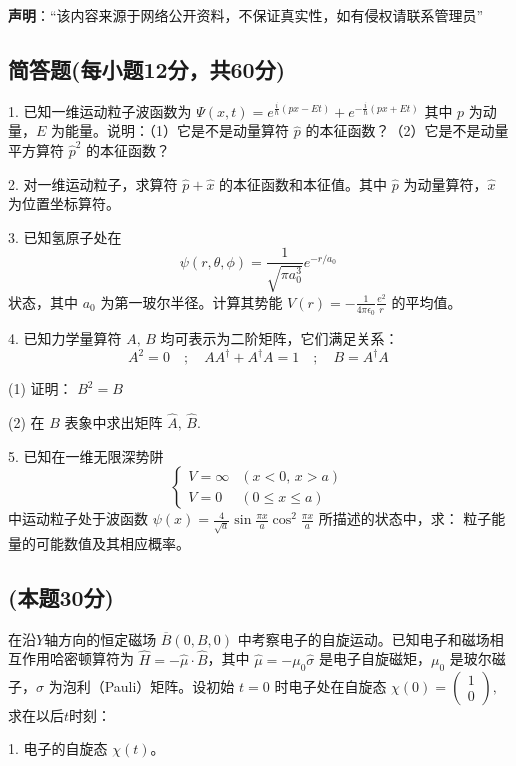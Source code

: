 
\textbf{声明}：“该内容来源于网络公开资料，不保证真实性，如有侵权请联系管理员”

\subsection{简答题(每小题12分，共60分)}
1. 已知一维运动粒子波函数为
$ \Psi(x, t) = e^{\frac{i}{\hbar}(px - Et)} + e^{-\frac{i}{\hbar}(px + Et)}$ 
其中 $p$ 为动量，$E$ 为能量。说明：（1）它是不是动量算符 $\hat{p}$ 的本征函数？（2）它是不是动量平方算符 $\hat{p}^2$ 的本征函数？

2. 对一维运动粒子，求算符 $\hat{p} +\hat{x}$ 的本征函数和本征值。其中 $\hat{p}$ 为动量算符，$\hat{x}$ 为位置坐标算符。

3. 已知氢原子处在
$$ \psi(r, \theta, \phi) = \frac{1}{\sqrt{\pi a_0^3}} e^{-r/a_0}~$$ 
状态，其中 $a_0$ 为第一玻尔半径。计算其势能 $V(r) = -\frac{1}{4\pi \epsilon_0} \frac{e^2}{r}$ 的平均值。

4. 已知力学量算符 $A, \, B$ 均可表示为二阶矩阵，它们满足关系：
$$A^2 = 0 \quad ; \quad AA^{\dagger} + A^{\dagger}A = 1 \quad ; \quad B = A^{\dagger}A~$$

(1) 证明： $B^2 = B$

(2) 在 $B$ 表象中求出矩阵 $\hat{A}, \, \hat{B}$.

5. 已知在一维无限深势阱
$$
\begin{cases}
V = \infty & (x < 0, \, x > a) \\
V = 0 & (0 \leq x \leq a)
\end{cases}~
$$
中运动粒子处于波函数 $\psi(x) = \frac{4}{\sqrt{a}} \sin{\frac{\pi x}{a}} \cos^2{\frac{\pi x}{a}}$ 所描述的状态中，求：
粒子能量的可能数值及其相应概率。

\subsection{(本题30分)}
在沿$Y$轴方向的恒定磁场 $\overline{B}(0, B, 0)$ 中考察电子的自旋运动。已知电子和磁场相互作用哈密顿算符为 $\hat H = -\hat{\mu} \cdot \hat{B}$，其中 $\hat{\mu} = -\mu_{0} \hat{\sigma}$ 是电子自旋磁矩，$\mu_0$ 是玻尔磁子，$\hat{\sigma}$ 为泡利（Pauli）矩阵。设初始 $t=0$ 时电子处在自旋态
$ \chi(0) = \begin{pmatrix} 1 \\ 0 \end{pmatrix},$
求在以后$t$时刻：

1. 电子的自旋态 $\chi(t)$。

